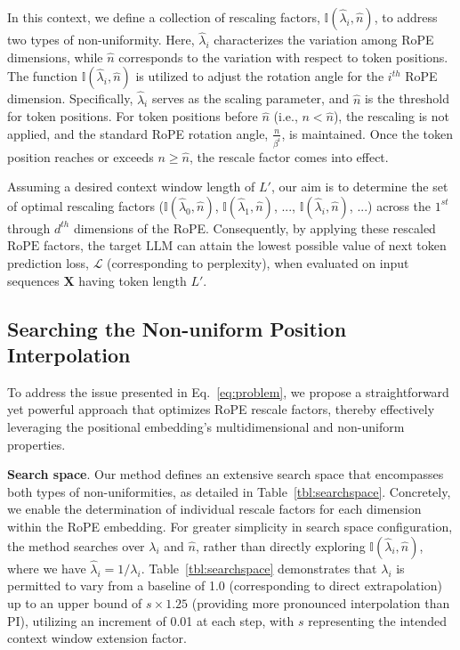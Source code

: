 In this context, we define a collection of rescaling factors, $\mathbb{I}(\hat{\lambda}_{i},\hat{n})$, to address two types of non-uniformity. Here, $\hat{\lambda}_i$ characterizes the variation among RoPE dimensions, while $\hat{n}$ corresponds to the variation with respect to token positions. The function $\mathbb{I}(\hat{\lambda}_{i},\hat{n})$ is utilized to adjust the rotation angle for the $i^{th}$ RoPE dimension. Specifically, $\hat\lambda_{i}$ serves as the scaling parameter, and $\hat{n}$ is the threshold for token positions. For token positions before $\hat{n}$ (i.e., $n < \hat{n}$), the rescaling is not applied, and the standard RoPE rotation angle, $\frac{n}{\beta^i}$, is maintained. Once the token position reaches or exceeds $n \geq \hat{n}$, the rescale factor comes into effect.

Assuming a desired context window length of $L'$, our aim is to determine the set of optimal rescaling factors ($\mathbb{I}(\hat{\lambda}_{0},\hat{n})$, $\mathbb{I}(\hat{\lambda}_{1},\hat{n})$, ..., $\mathbb{I}(\hat{\lambda}_{i},\hat{n})$, ...) across the $1^{st}$ through $d^{th}$ dimensions of the RoPE. Consequently, by applying these rescaled $\text{RoPE}$ factors, the target $\text{LLM}$ can attain the lowest possible value of next token prediction loss, $\mathcal{L}$ (corresponding to perplexity), when evaluated on input sequences $\mathbf{X}$ having token length $L'$.

\subsection{Searching the Non-uniform Position Interpolation}

To address the issue presented in Eq.~\ref{eq:problem}, we propose a straightforward yet powerful approach that optimizes RoPE rescale factors, thereby effectively leveraging the positional embedding’s multidimensional and non-uniform properties.

\textbf{Search space}. Our method defines an extensive search space that encompasses both types of non-uniformities, as detailed in Table~\ref{tbl:searchspace}. Concretely, we enable the determination of individual rescale factors for each dimension within the RoPE embedding. For greater simplicity in search space configuration, the method searches over $\lambda_i$ and $\hat{n}$, rather than directly exploring $\mathbb{I}(\hat{\lambda}_{i},\hat{n})$, where we have $\hat{\lambda}_{i}=1/\lambda_i$. Table~\ref{tbl:searchspace} demonstrates that $\lambda_i$ is permitted to vary from a baseline of 1.0 (corresponding to direct extrapolation) up to an upper bound of $s\times1.25$ (providing more pronounced interpolation than PI), utilizing an increment of 0.01 at each step, with $s$ representing the intended context window extension factor.

